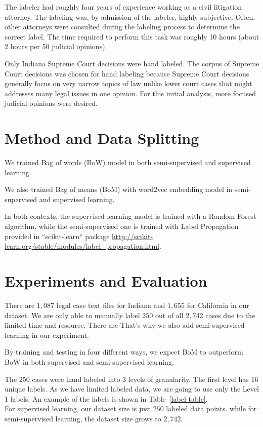 \documentclass[11pt]{article}
\begin{document}
The labeler had roughly four years of experience working as a civil litigation attorney.  The labeling was, by admission of the labeler, highly subjective.  Often, other attorneys were consulted during the labeling process to determine the correct label.  The time required to perform this task was roughly 10 hours (about 2 hours per 50 judicial opinions).  

Only Indiana Supreme Court decisions were hand labeled.  The corpus of Supreme Court decisions was chosen for hand labeling because Supreme Court decisions generally focus on very narrow topics of law unlike lower court cases that might addresses many legal issues in one opinion.  For this initial analysis, more focused judicial opinions were desired.

\section{Method and Data Splitting}
We trained Bag of words (BoW) model in both semi-supervised and supervised learning.

We also trained Bag of means (BoM) with word2vec embedding model in semi-supervised and supervised learning.

In both contexts, the supervised learning model is trained with a Random Forest algorithm, while the semi-supervised one is trained with Label Propagation provided in ``scikit-learn`` package \url{http://scikit-learn.org/stable/modules/label_propagation.html}.

\section{Experiments and Evaluation}
There are $1,087$ legal case text files for Indiana and $1,655$ for California in our dataset. We are only able to manually label $250$ out of all $2,742$ cases due to the limited time and resource. There are That's why we also add semi-supervised learning in our experiment.

By training and testing in four different ways, we expect BoM to outperform BoW in both supervised and semi-supervised learning.

The 250 cases were hand labeled into 3 levels of granularity. The first level has $16$ unique labels. As we have limited labeled data, we are going to use only the Level 1 labels. An example of the labels is shown in Table~\ref{label-table}.\\

For supervised learning, our dataset size is just $250$ labeled data points. while for semi-supervised learning, the dataset size grows to $2,742$.
\end{document}
